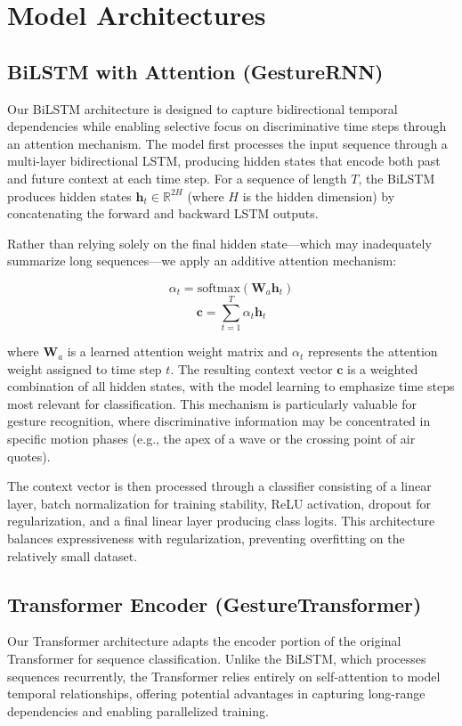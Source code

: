 \documentclass[conference]{IEEEtran}
\begin{document}
\section{Model Architectures}

\subsection{BiLSTM with Attention (GestureRNN)}
Our BiLSTM architecture is designed to capture bidirectional temporal dependencies while enabling selective focus on discriminative time steps through an attention mechanism. The model first processes the input sequence through a multi-layer bidirectional LSTM, producing hidden states that encode both past and future context at each time step. For a sequence of length $T$, the BiLSTM produces hidden states $\mathbf{h}_t \in \mathbb{R}^{2H}$ (where $H$ is the hidden dimension) by concatenating the forward and backward LSTM outputs.

Rather than relying solely on the final hidden state---which may inadequately summarize long sequences---we apply an additive attention mechanism:

\begin{equation}
\alpha_t = \text{softmax}(\mathbf{W}_a \mathbf{h}_t)
\end{equation}
\begin{equation}
\mathbf{c} = \sum_{t=1}^{T} \alpha_t \mathbf{h}_t
\end{equation}

\noindent where $\mathbf{W}_a$ is a learned attention weight matrix and $\alpha_t$ represents the attention weight assigned to time step $t$. The resulting context vector $\mathbf{c}$ is a weighted combination of all hidden states, with the model learning to emphasize time steps most relevant for classification. This mechanism is particularly valuable for gesture recognition, where discriminative information may be concentrated in specific motion phases (e.g., the apex of a wave or the crossing point of air quotes).

The context vector is then processed through a classifier consisting of a linear layer, batch normalization for training stability, ReLU activation, dropout for regularization, and a final linear layer producing class logits. This architecture balances expressiveness with regularization, preventing overfitting on the relatively small dataset.

\subsection{Transformer Encoder (GestureTransformer)}
Our Transformer architecture adapts the encoder portion of the original Transformer \cite{vaswani2017} for sequence classification. Unlike the BiLSTM, which processes sequences recurrently, the Transformer relies entirely on self-attention to model temporal relationships, offering potential advantages in capturing long-range dependencies and enabling parallelized training.
\end{document}
